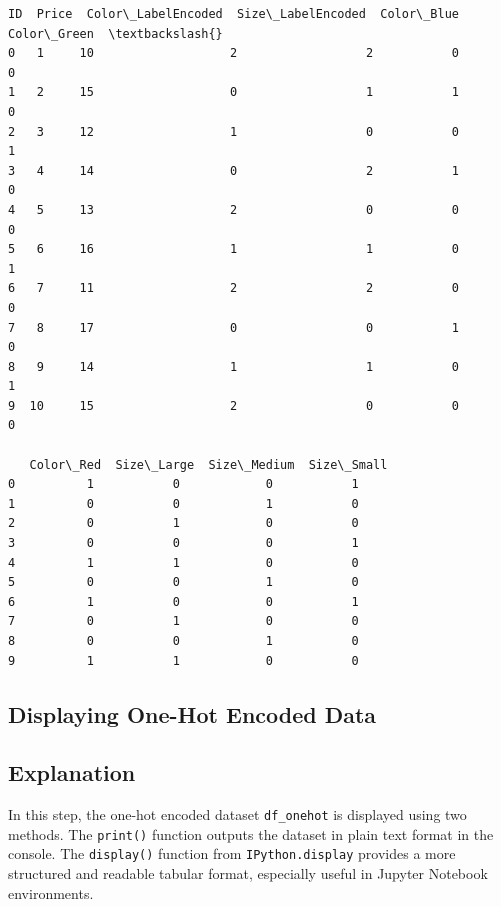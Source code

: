 \documentclass[11pt]{article}
\makeatletter
\newcommand{\boxspacing}{\kern\kvtcb@left@rule\kern\kvtcb@boxsep}
\newcommand{\prompt}[4]{
        {\ttfamily\llap{{\color{#2}[#3]:\hspace{3pt}#4}}\vspace{-\baselineskip}}
    }
\makeatother
\begin{document}
            \begin{tcolorbox}[breakable, size=fbox, boxrule=.5pt, pad at break*=1mm, opacityfill=0]
\prompt{Out}{outcolor}{6}{\boxspacing}
\begin{Verbatim}[commandchars=\\\{\}]
   ID  Price  Color\_LabelEncoded  Size\_LabelEncoded  Color\_Blue  Color\_Green  \textbackslash{}
0   1     10                   2                  2           0            0
1   2     15                   0                  1           1            0
2   3     12                   1                  0           0            1
3   4     14                   0                  2           1            0
4   5     13                   2                  0           0            0
5   6     16                   1                  1           0            1
6   7     11                   2                  2           0            0
7   8     17                   0                  0           1            0
8   9     14                   1                  1           0            1
9  10     15                   2                  0           0            0

   Color\_Red  Size\_Large  Size\_Medium  Size\_Small
0          1           0            0           1
1          0           0            1           0
2          0           1            0           0
3          0           0            0           1
4          1           1            0           0
5          0           0            1           0
6          1           0            0           1
7          0           1            0           0
8          0           0            1           0
9          1           1            0           0
\end{Verbatim}
\end{tcolorbox}

\subsection{Displaying One-Hot Encoded Data}

\subsection*{Explanation}
In this step, the one-hot encoded dataset \texttt{df\_onehot} is displayed using two methods. The \texttt{print()} function outputs the dataset in plain text format in the console. The \texttt{display()} function from \texttt{IPython.display} provides a more structured and readable tabular format, especially useful in Jupyter Notebook environments.
        
\end{document}
